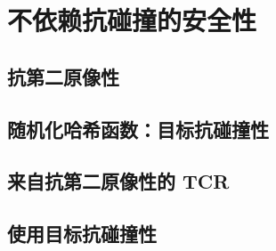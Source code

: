 \section{不依赖抗碰撞的安全性}\label{sec:8-11}

\subsection{抗第二原像性}\label{subsec:8-11-1}

\subsection{随机化哈希函数：目标抗碰撞性}\label{subsec:8-11-2}

\subsection{来自抗第二原像性的 TCR}\label{subsec:8-11-3}

\subsection{使用目标抗碰撞性}\label{subsec:8-11-4}